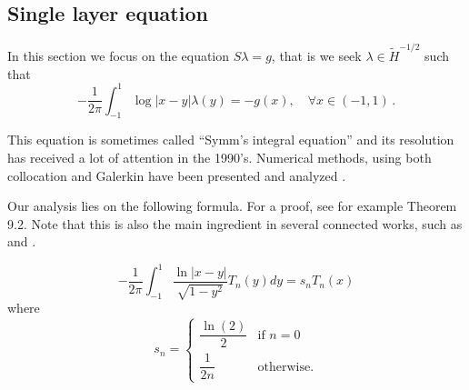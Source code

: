 \documentclass[a4paper]{article}
\begin{document}
	
	\subsection{Single layer equation}
	
	In this section we focus on the equation $S\lambda = g$, that is we seek $\lambda \in \tilde{H}^{-1/2}$ such that 
	\begin{equation}
	-\frac{1}{2\pi}\int_{-1}^{1} \log|x-y| \lambda(y) = -g(x), \quad \forall x\in (-1,1)\,.\label{Slambda}
	\end{equation} 
	
	This equation is sometimes called ``Symm's integral equation'' and its resolution has received a lot of attention in the 1990's. Numerical methods, using both collocation and Galerkin have been presented and analyzed \cite{atkinson1991numerical,yan1988integral,yan1990cosine,sloan1992collocation,yan1989mesh}. 
	
	
	Our analysis lies on the following formula. For a proof, see for example \cite{mason2002chebyshev} Theorem 9.2. Note that this is also the main ingredient in several connected works, such as \cite{jiang2004second} and \cite{bruno2012second}.
	
	\begin{Prop}
		\[ -\frac{1}{2\pi}\int_{-1}^{1} \frac{\ln|x-y|}{\sqrt{1 - y^2}}T_n(y)dy = s_n T_n(x)\]
		where
		\[s_n = \begin{cases}
		\dfrac{\ln(2)}{2} & \text{if } n=0\\
		\dfrac{1}{2n} & \text{otherwise}.
		\end{cases}\]
		\label{STn}
	\end{Prop}
\end{document}
